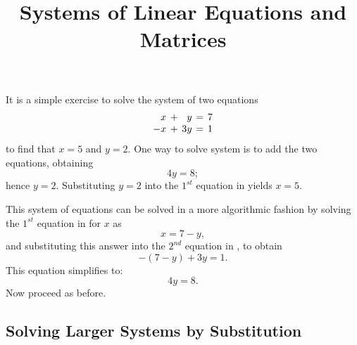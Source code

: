 \documentclass{ximera}
\title{Systems of Linear Equations and Matrices}
\begin{document}
\begin{abstract}
\end{abstract}
\maketitle


\label{S:2.1}

It is a simple exercise to solve the system of two equations
\begin{equation} \label{small}
\arraycolsep 2pt
\begin{array}{rcrcr}
 x & + & y & = & 7 \\
-x & + & 3y & = & 1
\end{array}
\end{equation}
to find that $x=5$ and $y=2$.  One way to solve
system  is to add the two equations, obtaining
\[
4y=8;
\]
hence $y=2$.  Substituting $y=2$ into the $1^{st}$ equation in
 yields $x=5$.

This system of equations can be solved in a more algorithmic
fashion by solving the $1^{st}$ equation in  for $x$
as
\[
x = 7 - y,
\]
and substituting this answer into the $2^{nd}$ equation in
, to obtain
\[
-(7-y) +3y = 1.
\]
This equation simplifies to:
\[
4y = 8.
\]
Now proceed as before.

\subsection*{Solving Larger Systems by Substitution}
\end{document}
